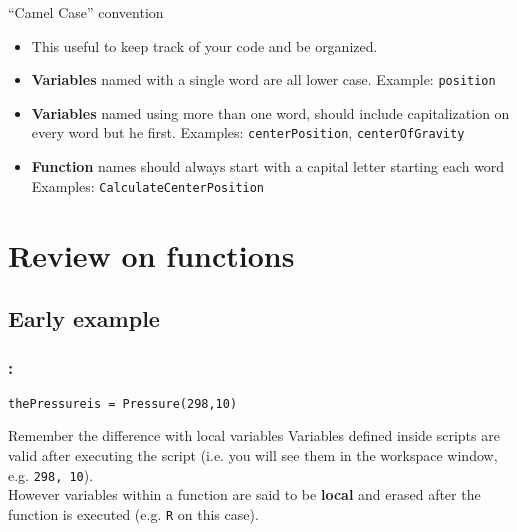 \documentclass[11pt]{beamer}
\begin{document}
\begin{frame}[fragile]
\begin{minipage}[t]{0.51\linewidth}
\begin{block}{“Camel Case” convention}
\begin{itemize}
	\setlength\itemsep{-0pt}
	\item This useful to keep track of your code and be organized.	
	\item \textbf{Variables} named with a single word are all lower case.  Example: \verb|position|
	\item \textbf{Variables} named using more than one word, should include capitalization on every word but he first. Examples: \verb|centerPosition|, \verb|centerOfGravity|
	\item \textbf{Function} names should always start with a capital letter starting each word
	Examples: \verb|CalculateCenterPosition|
\end{itemize}	
		\end{block}
	\end{minipage}
	
\end{frame}

\section{Review on functions}

\subsection{Early example}
\begin{frame}[fragile]
	\frametitle{\secname: \subsecname}
	\vspace{-2mm}
	
	
	\vspace{-3mm}	
\begin{lstlisting}[caption = {Script}]
thePressureis = Pressure(298,10)
\end{lstlisting}

	\vspace{-2mm}	
	\begin{alertblock}{Remember the difference with local variables}
		Variables defined inside scripts are valid after executing the script (i.e. you will see them in the workspace window, e.g. \verb|298, 10|).\\
		However variables within a function are said to be \textbf{local} and erased after the function is executed (e.g. \verb|R| on this case).
	\end{alertblock}
\end{frame}
\end{document}
